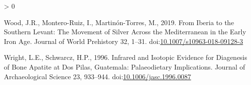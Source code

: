 \documentclass[5p]{elsarticle} %
\newlength{\cslhangindent}
\newenvironment{CSLReferences}[2] %
 {%
  \setlength{\parindent}{0pt}
  \ifodd #1 \everypar{\setlength{\hangindent}{\cslhangindent}}\ignorespaces\fi
  \ifnum #2 > 0
  \setlength{\parskip}{#2\baselineskip}
  \fi
 }%
 {}
\begin{document}
\begin{CSLReferences}{1}{0}
\leavevmode\hypertarget{ref-wood_etal19}{}%
Wood, J.R., Montero-Ruiz, I., Martinón-Torres, M., 2019. From {Iberia} to the {Southern Levant}: {The Movement} of {Silver Across} the {Mediterranean} in the {Early Iron Age}. Journal of World Prehistory 32, 1--31. doi:\href{https://doi.org/10.1007/s10963-018-09128-3}{10.1007/s10963-018-09128-3}

\leavevmode\hypertarget{ref-wright_schwarcz96}{}%
Wright, L.E., Schwarcz, H.P., 1996. Infrared and {Isotopic Evidence} for {Diagenesis} of {Bone Apatite} at {Dos Pilas}, {Guatemala}: {Palaeodietary Implications}. Journal of Archaeological Science 23, 933--944. doi:\href{https://doi.org/10.1006/jasc.1996.0087}{10.1006/jasc.1996.0087}

\end{CSLReferences}
\end{document}
